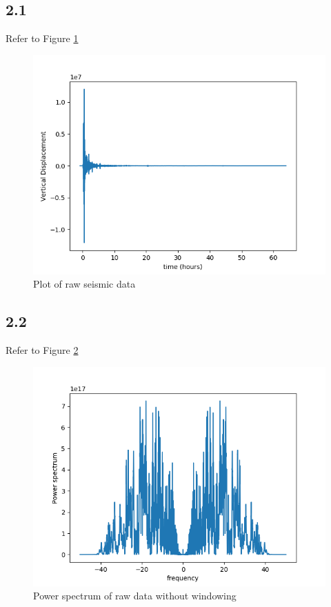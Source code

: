 \subsection*{2.1}
Refer to Figure \ref{fig:part2_1}
\begin{figure}[]
	\caption{Plot of raw seismic data}
	\label{fig:part2_1}
	\includegraphics[width=\linewidth]{figures/part2_1.png}
\end{figure}

\subsection*{2.2}
Refer to Figure \ref{fig:part2_2}
\begin{figure}[]
	\caption{Power spectrum of raw data without windowing}
	\label{fig:part2_2}
	\includegraphics[width=\linewidth]{figures/part2_2.png}
\end{figure}

